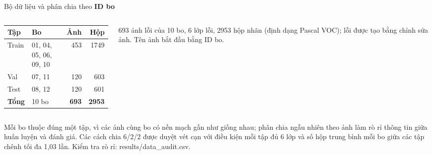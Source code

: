 \documentclass[aspectratio=169,11pt,t]{beamer}
\newcommand{\mycode}[1]{{\ttfamily\color{codeinl}#1}}
\newcommand{\hl}[1]{{\bfseries\color{coral}#1}}
\newcommand{\hdr}[1]{{\bfseries\color{muted}#1}}
\begin{document}
\begin{frame}{Bộ dữ liệu và phân chia theo \hl{ID bo}}
  \begin{columns}[T,onlytextwidth]
    \begin{column}{0.52\textwidth}
      \footnotesize
      \renewcommand{\arraystretch}{1.25}\setlength{\tabcolsep}{4pt}
      \begin{tabular}{@{}L{1.0cm}L{3.4cm}rr@{}}
        \toprule
        \hdr{Tập} & \hdr{Bo} & \hdr{Ảnh} & \hdr{Hộp} \\
        \midrule
        Train & 01, 04, 05, 06, 09, 10 & 453 & 1749 \\
        Val & 07, 11 & 120 & 603 \\
        Test & 08, 12 & 120 & 601 \\
        \midrule
        \textbf{Tổng} & 10 bo & \textbf{693} & \textbf{2953} \\
        \bottomrule
      \end{tabular}
    \end{column}
    \begin{column}{0.44\textwidth}
      \begin{why}
        \scriptsize 693 ảnh lỗi của 10 bo, 6 lớp lỗi, 2953 hộp nhãn (định dạng Pascal VOC); lỗi được tạo bằng chỉnh sửa ảnh. Tên ảnh bắt đầu bằng ID bo.
      \end{why}
    \end{column}
  \end{columns}
  \vspace{3pt}
  \begin{key}
    \scriptsize Mỗi bo thuộc đúng một tập, vì các ảnh cùng bo có nền mạch gần như giống nhau; phân chia ngẫu nhiên theo ảnh làm rò rỉ thông tin giữa huấn luyện và đánh giá. Các cách chia 6/2/2 được duyệt vét cạn với điều kiện mỗi tập đủ 6 lớp và số hộp trung bình mỗi bo giữa các tập chênh tối đa 1,03 lần. Kiểm tra rò rỉ: \mycode{results/data\_audit.csv}.
  \end{key}
\end{frame}
\end{document}
